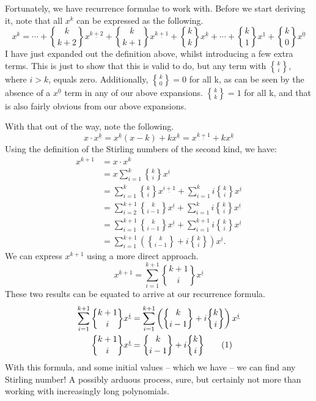 \documentclass[a4paper]{article}
\theoremstyle{definition}
\begin{document}
Fortunately, we have recurrence formulae to work with.
Before we start deriving it, note that all $x^k$ can be expressed as the following.
\begin{equation*}
    x^k = \cdots + {k\brace k+2}x^{\underline{k+2}} + {k\brace k+1}x^{\underline{k+1}} + {k\brace k}x^{\underline{k}} + \cdots + {k\brace 1}x^{\underline{1}} + {k\brace 0}x^{\underline{0}}
\end{equation*}
I have just expanded out the definition above, whilst introducing a few extra terms.
This is just to show that this is valid to do, but any term with $k \brace i$, where $i > k$, equals zero.
Additionally, ${k \brace 0} = 0$ for all k, as can be seen by the absence of a $x^{\underline{0}}$ term in any of our above expansions.
${k\brace k} = 1$ for all k, and that is also fairly obvious from our above expansions.

With that out of the way, note the following.
\begin{equation*}
    x \cdot x^{\underline{k}} = x^{\underline{k}}(x-k) + kx^{\underline{k}} = x^{\underline{k+1}} + kx^{\underline{k}}
\end{equation*}
Using the definition of the Stirling numbers of the second kind, we have:
\begin{align*}
    x^{k+1} & =x\cdot x^k                                                                                         \\
            & = x \sum_{i=1}^{k} {k\brace i} x^{\underline{i}}                                                    \\
            & =\sum_{i=1}^{k} {k\brace i} x^{\underline{i+1}}+ \sum_{i=1}^{k} i{k\brace i} x^{\underline{i}}      \\
            & = \sum_{i=2}^{k+1} {k\brace i-1} x^{\underline{i}}+ \sum_{i=1}^{k} i{k\brace i} x^{\underline{i}}   \\
            & = \sum_{i=1}^{k+1} {k\brace i-1} x^{\underline{i}}+ \sum_{i=1}^{k+1} i{k\brace i} x^{\underline{i}} \\
            & = \sum_{i=1}^{k+1} \left({k\brace i-1} + i{k\brace i} \right)x^{\underline{i}}.
\end{align*}
We can express $x^{k+1}$ using a more direct approach.
\begin{equation*}
    x^{k+1} = \sum_{i=1}^{k+1} {{k+1}\brace {i}} x^{\underline{i}}
\end{equation*}
These two results can be equated to arrive at our recurrence formula.
\begin{align*}
    \sum_{i=1}^{k+1} {{k+1}\brace {i}} x^{\underline{i}} & = \sum_{i=1}^{k+1} \left({k\brace i-1} + i{k\brace i} \right)x^{\underline{i}} \\
    {{k+1}\brace {i}} x^{\underline{i}}                  & ={k\brace i-1} + i{k\brace i} \stepcounter{equation}\tag{\theequation}
\end{align*}
With this formula, and some initial values -- which we have -- we can find any Stirling number!
A possibly arduous process, sure, but certainly not more than working with increasingly long polynomials.
\end{document}
